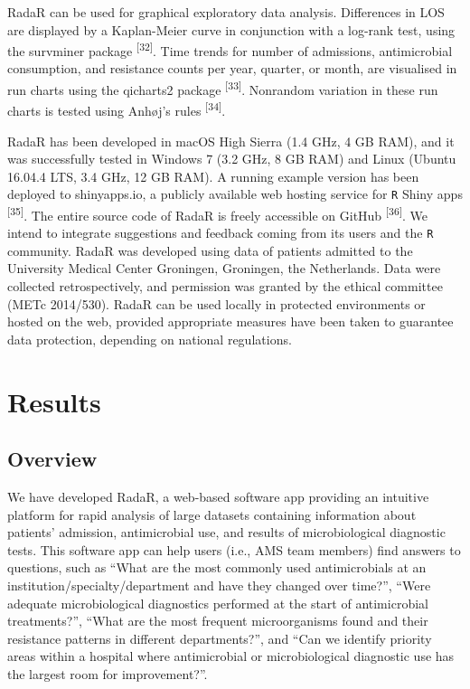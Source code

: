 \documentclass[
]{book}
\begin{document}
RadaR can be used for graphical exploratory data analysis. Differences in LOS are displayed by a Kaplan-Meier curve in conjunction with a log-rank test, using the survminer package \textsuperscript{{[}32{]}}. Time trends for number of admissions, antimicrobial consumption, and resistance counts per year, quarter, or month, are visualised in run charts using the qicharts2 package \textsuperscript{{[}33{]}}. Nonrandom variation in these run charts is tested using Anhøj's rules \textsuperscript{{[}34{]}}.

RadaR has been developed in macOS High Sierra (1.4 GHz, 4 GB RAM), and it was successfully tested in Windows 7 (3.2 GHz, 8 GB RAM) and Linux (Ubuntu 16.04.4 LTS, 3.4 GHz, 12 GB RAM). A running example version has been deployed to shinyapps.io, a publicly available web hosting service for \texttt{R} Shiny apps \textsuperscript{{[}35{]}}. The entire source code of RadaR is freely accessible on GitHub \textsuperscript{{[}36{]}}. We intend to integrate suggestions and feedback coming from its users and the \texttt{R} community. RadaR was developed using data of patients admitted to the University Medical Center Groningen, Groningen, the Netherlands. Data were collected retrospectively, and permission was granted by the ethical committee (METc 2014/530). RadaR can be used locally in protected environments or hosted on the web, provided appropriate measures have been taken to guarantee data protection, depending on national regulations.

\hypertarget{results}{%
\section{Results}\label{results}}

\hypertarget{overview}{%
\subsection{Overview}\label{overview}}

We have developed RadaR, a web-based software app providing an intuitive platform for rapid analysis of large datasets containing information about patients' admission, antimicrobial use, and results of microbiological diagnostic tests. This software app can help users (i.e., AMS team members) find answers to questions, such as ``What are the most commonly used antimicrobials at an institution/specialty/department and have they changed over time?'', ``Were adequate microbiological diagnostics performed at the start of antimicrobial treatments?'', ``What are the most frequent microorganisms found and their resistance patterns in different departments?'', and ``Can we identify priority areas within a hospital where antimicrobial or microbiological diagnostic use has the largest room for improvement?''.
\end{document}
